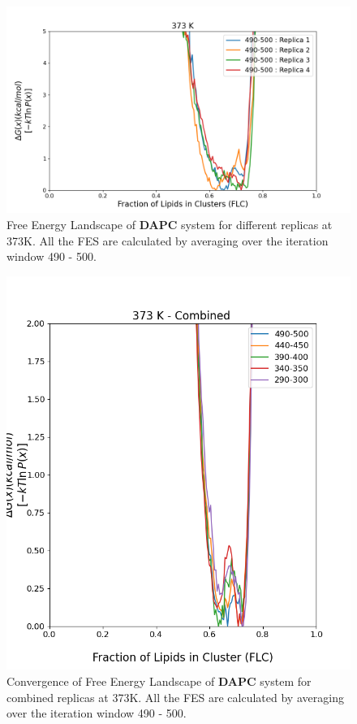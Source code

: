 \documentclass{biophys-new}
\begin{document}

\begin{figure}[hbt!]
\centering
\includegraphics[width=1.1\linewidth]{all_plots/ClusterLipids2Total/DPPC_DAPC_CHOL/373K/Average_DAPC_373_ClusterLipids2Total.png}
\caption{Free Energy Landscape of \textbf{DAPC} system for different replicas at 373K. All the FES are calculated by averaging over the iteration window 490 - 500.}
\label{fig:view}

\end{figure}

\begin{figure}[hbt!]
\centering
\includegraphics[width=0.6\linewidth]{all_plots/ClusterLipids2Total/DPPC_DAPC_CHOL/373K/Convergence_DAPC_MULTI__373_ClusterLipids2Total.png}
\caption{Convergence of Free Energy Landscape of \textbf{DAPC} system for combined replicas at 373K. All the FES are calculated by averaging over the iteration window 490 - 500.}
\label{fig:view}

\end{figure}
\end{document}
